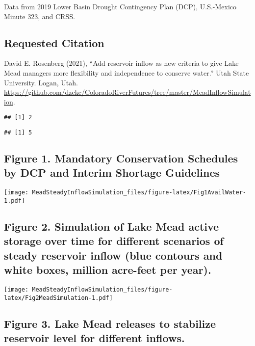 \documentclass[]{article}
\begin{document}
Data from 2019 Lower Basin Drought Contingency Plan (DCP), U.S.-Mexico
Minute 323, and CRSS.

\subsection{Requested Citation}\label{requested-citation}

David E. Rosenberg (2021), ``Add reservoir inflow as new criteria to
give Lake Mead managers more flexibility and independence to conserve
water.'' Utah State University. Logan, Utah.
\url{https://github.com/dzeke/ColoradoRiverFutures/tree/master/MeadInflowSimulation}.

\begin{verbatim}
## [1] 2
\end{verbatim}

\begin{verbatim}
## [1] 5
\end{verbatim}

\subsection{Figure 1. Mandatory Conservation Schedules by DCP and
Interim Shortage
Guidelines}\label{figure-1.-mandatory-conservation-schedules-by-dcp-and-interim-shortage-guidelines}

\texttt{[image: MeadSteadyInflowSimulation\_files/figure-latex/Fig1AvailWater-1.pdf]}

\subsection{Figure 2. Simulation of Lake Mead active storage over time
for different scenarios of steady reservoir inflow (blue contours and
white boxes, million acre-feet per
year).}\label{figure-2.-simulation-of-lake-mead-active-storage-over-time-for-different-scenarios-of-steady-reservoir-inflow-blue-contours-and-white-boxes-million-acre-feet-per-year.}

\texttt{[image: MeadSteadyInflowSimulation\_files/figure-latex/Fig2MeadSimulation-1.pdf]}

\subsection{Figure 3. Lake Mead releases to stabilize reservoir level
for different
inflows.}\label{figure-3.-lake-mead-releases-to-stabilize-reservoir-level-for-different-inflows.}
\end{document}
